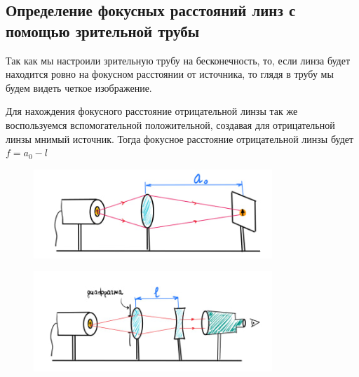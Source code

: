 \documentclass[a4paper,12pt]{article}
\theoremstyle{definition}
\begin{document}
\subsection{ Определение фокусных расстояний линз с помощью зрительной трубы}

Так как мы настроили зрительную трубу на бесконечность, то, если линза будет находится ровно на фокусном расстоянии от источника, то глядя в трубу мы будем видеть четкое изображение.

Для нахождения фокусного расстояние отрицательной линзы так же воспользуемся вспомогательной положительной, создавая для отрицательной линзы мнимый источник. Тогда фокусное расстояние отрицательной линзы будет $f = a_0 - l$


\begin{figure}[h]
    \centering
    \includegraphics[width=9cm]{d1.jpg}
    \label{fig:vac}
\end{figure}

\begin{figure}[h!]
    \centering
    \includegraphics[width=9cm]{d2.jpg}
    \label{fig:vac}
\end{figure}

\end{document}
